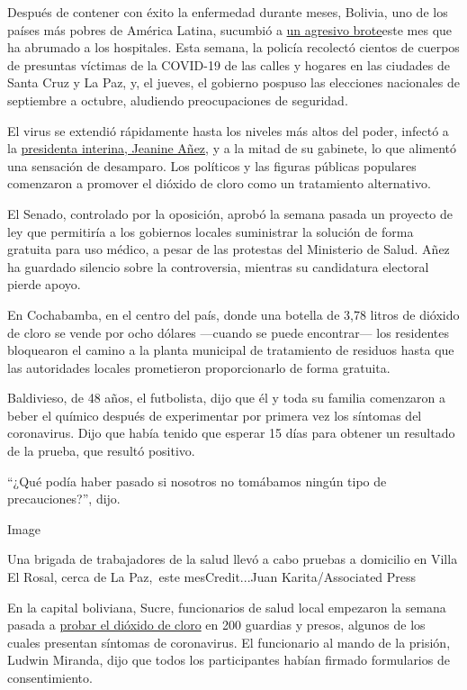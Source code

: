 Después de contener con éxito la enfermedad durante meses, Bolivia, uno
de los países más pobres de América Latina, sucumbió a
\href{https://www.nytimes3xbfgragh.onion/2020/07/09/world/americas/bolivia-president-jeanine-anez-coronavirus.html?searchResultPosition=1}{un
agresivo brote}este mes que ha abrumado a los hospitales. Esta semana,
la policía recolectó cientos de cuerpos de presuntas víctimas de la
COVID-19 de las calles y hogares en las ciudades de Santa Cruz y La Paz,
y, el jueves, el gobierno pospuso las elecciones nacionales de
septiembre a octubre, aludiendo preocupaciones de seguridad.

El virus se extendió rápidamente hasta los niveles más altos del poder,
infectó a la
\href{https://www.nytimes3xbfgragh.onion/2020/07/09/world/americas/bolivia-president-jeanine-anez-coronavirus.html}{presidenta
interina, Jeanine Añez}, y a la mitad de su gabinete, lo que alimentó
una sensación de desamparo. Los políticos y las figuras públicas
populares comenzaron a promover el dióxido de cloro como un tratamiento
alternativo.

El Senado, controlado por la oposición, aprobó la semana pasada un
proyecto de ley que permitiría a los gobiernos locales suministrar la
solución de forma gratuita para uso médico, a pesar de las protestas del
Ministerio de Salud. Añez ha guardado silencio sobre la controversia,
mientras su candidatura electoral pierde apoyo.

En Cochabamba, en el centro del país, donde una botella de 3,78 litros
de dióxido de cloro se vende por ocho dólares ---cuando se puede
encontrar--- los residentes bloquearon el camino a la planta municipal
de tratamiento de residuos hasta que las autoridades locales prometieron
proporcionarlo de forma gratuita.

Baldivieso, de 48 años, el futbolista, dijo que él y toda su familia
comenzaron a beber el químico después de experimentar por primera vez
los síntomas del coronavirus. Dijo que había tenido que esperar 15 días
para obtener un resultado de la prueba, que resultó positivo.

``¿Qué podía haber pasado si nosotros no tomábamos ningún tipo de
precauciones?'', dijo.

Image

Una brigada de trabajadores de la salud llevó a cabo pruebas a domicilio
en Villa El Rosal, cerca de La Paz,~este mesCredit...Juan
Karita/Associated Press

En la capital boliviana, Sucre, funcionarios de salud local empezaron la
semana pasada a
\href{https://www.facebookcorewwwi.onion/cadenaarednacional/videos/648916312499999}{probar
el dióxido de cloro} en 200 guardias y presos, algunos de los cuales
presentan síntomas de coronavirus. El funcionario al mando de la
prisión, Ludwin Miranda, dijo que todos los participantes habían firmado
formularios de consentimiento.

